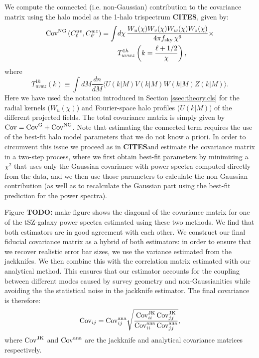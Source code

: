 \documentclass[useAMS,usenatbib]{mn2e}
\newcommand{\cites}{{\bf CITES}}
\newcommand{\todo}[1]{{\bf TODO:} #1}
\begin{document}
    We compute the connected (i.e. non-Gaussian) contribution to the covariance matrix using the halo model as the 1-halo trispectrum \cites, given by:
    \begin{align}\nonumber
      {\rm Cov}^{\rm NG}\left(C^{uv}_\ell,C^{wz}_{\ell'}\right)=\int &d\chi\,\frac{W_u(\chi)W_v(\chi)W_w(\chi)W_z(\chi)}{4\pi f_{\rm sky}\,\chi^6}\times\\\label{eq:cov_ng}
      &T^{1h}_{uvwz}\left(k=\frac{\ell+1/2}{\chi}\right),
    \end{align}
    where
    \begin{equation}\nonumber
      T^{1h}_{uvwz}(k)\equiv\int dM\frac{dn}{dM}\langle U(k|M) V(k|M) W(k|M) Z(k|M)\rangle.
    \end{equation}
    Here we have used the notation introduced in Section \ref{ssec:theory.cls} for the radial kernels ($W_u(\chi)$) and Fourier-space halo profiles ($U(k|M)$) of the different projected fields. The total covariance matrix is simply given by ${\rm Cov}={\rm Cov}^{\rm G}+{\rm Cov}^{\rm NG}$. Note that estimating the connected term requires the use of the best-fit halo model parameters that we do not know a priori. In order to circumvent this issue we proceed as in \cites and estimate the covariance matrix in a two-step process, where we first obtain best-fit parameters by minimizing a $\chi^2$ that uses only the Gaussian covariance with power spectra computed directly from the data, and we then use those parameters to calculate the non-Gaussian contribution (as well as to recalculate the Gaussian part using the best-fit prediction for the power spectra).

    Figure  \todo{make figure} shows the diagonal of the covariance matrix for one of the tSZ-galaxy power spectra estimated using these two methods. We find that both estimators are in good agreement with each other. We construct our final fiducial covariance matrix as a hybrid of both estimators: in order to ensure that we recover realistic error bar sizes, we use the variance estimated from the jackknifes. We then combine this with the correlation matrix estimated with our analytical method. This ensures that our estimator accounts for the coupling between different modes caused by survey geometry and non-Gaussianities while avoiding the the statistical noise in the jackknife estimator. The final covariance is therefore:
    \begin{equation}
      {\rm Cov}_{ij} = {\rm Cov}^{\rm ana}_{ij} \sqrt{\frac{{\rm Cov}^{\rm JK}_{ii}\,{\rm Cov}^{\rm JK}_{jj}}{{\rm Cov}^{\rm ana}_{ii}\,{\rm Cov}^{\rm ana}_{jj}}},
    \end{equation}
    where ${\rm Cov}^{\rm JK}$ and ${\rm Cov}^{\rm ana}$ are the jackknife and analytical covariance matrices respectively.
\end{document}
